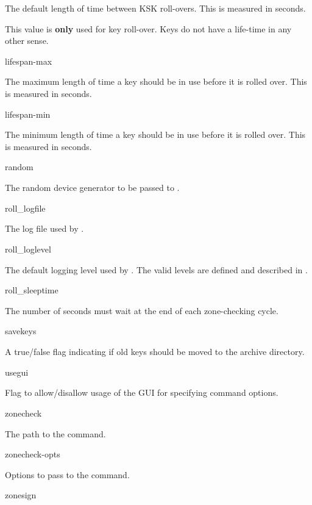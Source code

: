 \begin{description}
The default length of time between KSK roll-overs.  This is measured in
seconds.

This value is {\bf only} used for key roll-over.  Keys do not have a life-time
in any other sense.

\item lifespan-max\verb" "

The maximum length of time a key should be in use before it is rolled over.
This is measured in seconds.

\item lifespan-min\verb" "

The minimum length of time a key should be in use before it is rolled over.
This is measured in seconds.

\item random\verb" "

The random device generator to be passed to .

\item roll\_logfile\verb" "

The log file used by .

\item roll\_loglevel\verb" "

The default logging level used by .  The valid levels are
defined and described in .

\item roll\_sleeptime\verb" "

The number of seconds  must wait at the end of each zone-checking
cycle.

\item savekeys\verb" "

A true/false flag indicating if old keys should be moved to the
archive directory.

\item usegui\verb" "

Flag to allow/disallow usage of the GUI for specifying command options.

\item zonecheck\verb" "

The path to the  command.

\item zonecheck-opts\verb" "

Options to pass to the  command.

\item zonesign\verb" "


\end{description}
